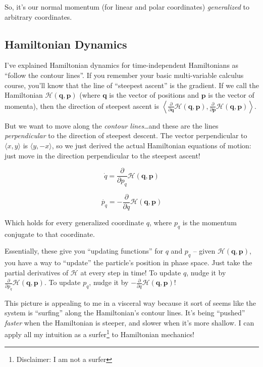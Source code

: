 \documentclass[]{article}
\begin{document}
So, it's our normal momentum (for linear and polar coordinates)
\emph{generalized} to arbitrary coordinates.

\subsection{Hamiltonian Dynamics}\label{hamiltonian-dynamics}

I've explained Hamiltonian dynamics for time-independent Hamiltonians as
``follow the contour lines''. If you remember your basic multi-variable calculus
course, you'll know that the line of ``steepest ascent'' is the gradient. If we
call the Hamiltonian \(\mathcal{H}(\mathbf{q},\mathbf{p})\) (where
\(\mathbf{q}\) is the vector of positions and \(\mathbf{p}\) is the vector of
momenta), then the direction of steepest ascent is
\(\left \langle \frac{\partial}{\partial \mathbf{q}} \mathcal{H}(\mathbf{q},\mathbf{p}), \frac{\partial}{\partial \mathbf{p}} \mathcal{H}(\mathbf{q},\mathbf{p}) \right \rangle\).

But we want to move along the \emph{contour lines}\ldots{}and these are the
lines \emph{perpendicular} to the direction of steepest descent. The vector
perpendicular to \(\langle x, y \rangle\) is \(\langle y, -x \rangle\), so we
just derived the actual Hamiltonian equations of motion: just move in the
direction perpendicular to the steepest ascent!

\[
\dot{q} = \frac{\partial}{\partial p_q} \mathcal{H}(\mathbf{q},\mathbf{p})
\]

\[
\dot{p_q} = - \frac{\partial}{\partial q} \mathcal{H}(\mathbf{q},\mathbf{p})
\]

Which holds for every generalized coordinate \(q\), where \(p_q\) is the
momentum conjugate to that coordinate.

Essentially, these give you ``updating functions'' for \(q\) and \(p_q\) --
given \(\mathcal{H}(\mathbf{q},\mathbf{p})\), you have a way to ``update'' the
particle's position in phase space. Just take the partial derivatives of
\(\mathcal{H}\) at every step in time! To update \(q\), nudge it by
\(\frac{\partial}{\partial p_q} \mathcal{H}(\mathbf{q},\mathbf{p})\). To update
\(p_q\), nudge it by
\(-\frac{\partial}{\partial q} \mathcal{H}(\mathbf{q},\mathbf{p})\)!

This picture is appealing to me in a visceral way because it sort of seems like
the system is ``surfing'' along the Hamiltonian's contour lines. It's being
``pushed'' \emph{faster} when the Hamiltonian is steeper, and slower when it's
more shallow. I can apply all my intuition as a surfer\footnote{Disclaimer: I am
  not a surfer} to Hamiltonian mechanics!
\end{document}

